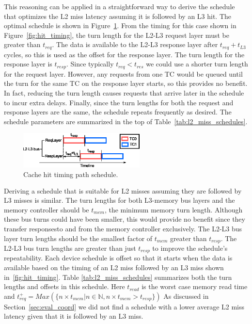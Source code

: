 This reasoning can be applied in a straightforward way to derive the schedule 
that optimizes the L2 miss latency assuming it is followed by an L3 hit.
The optimal schedule is shown in Figure~\ref{fig:hit_schedule}.
From the timing for this case shown in Figure~\ref{fig:hit_timing}, the turn
length for the L2-L3 request layer must be greater than $t_{req}$. The 
data is available to the L2-L3 response layer after $t_{req}+t_{L3}$ cycles, so 
this is used as the offset for the response layer. The turn length for the 
response layer is $t_{resp}$. Since typically $t_{req}<t_{res}$ we could use a 
shorter turn length for the request layer. However, any requests from one TC 
would be queued until the turn for the same TC on the response layer starts, so 
this provides no benefit. In fact, reducing the turn length causes requests 
that arrive later in the schedule to incur extra delays. Finally, since the 
turn lengths for both the request and response layers are the same, the 
schedule repeats frequently as desired. The schedule parameters are summarized 
in the top of Table~\ref{tab:l2_miss_schedules}.

\begin{figure}
    \begin{center}
        \includegraphics[width=2.5in]{figs/hit_schedule.eps}
        \caption{Cache hit timing path schedule.}
        \label{fig:hit_schedule}
    \end{center}
\end{figure}

Deriving a schedule that is suitable for L2 misses assuming they are followed 
by L3 misses is similar. The turn lengths for both L3-memory bus layers and
the memory controller should be $t_{mem}$, the minimum memory turn length.
Although these bus turns could have been smaller, this would provide no
benefit since they transfer responsesto and from the memory controller exclusively.
The L2-L3 bus layer turn lengths should be
the smallest factor of $t_{mem}$ greater than $t_{resp}$. The L2-L3 bus turn 
lengths are greater than just $t_{resp}$ to improve the schedule's repeatability.
Each device schedule is offset so that it starts when the data is available 
based on the timing of an L2 miss followed by an L3 miss shown 
in~\ref{fig:hit_timing}. Table \ref{tab:l2_miss_schedules} summarizes both the
turn lengths and offsets in this schedule. Here $t_{read}$ is the worst case
memory read time and
$t_{req}^+ = Max(\{n \times t_{mem} | n\in\mathbb{N}, n\times t_{mem} > t_{resp} \})$
As discussed in Section~\ref{sec:eval_coord} we did not find a schedule with 
a lower average L2 miss latency given that it is followed by an L3 miss.

